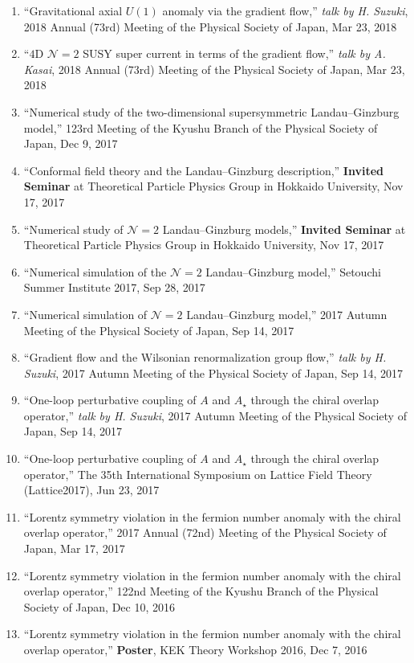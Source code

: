 \begin{enumerate}
 \item ``Gravitational axial $U(1)$ anomaly via the gradient flow,''
       \textit{talk by H. Suzuki},
       2018 Annual (73rd) Meeting of the Physical Society of Japan, Mar 23, 2018
 \item ``$4$D $\mathcal{N}=2$ SUSY super current in terms of the gradient flow,''
       \textit{talk by A. Kasai},
       2018 Annual (73rd) Meeting of the Physical Society of Japan, Mar 23, 2018
 \item ``Numerical study of the two-dimensional supersymmetric Landau--Ginzburg model,''
       123rd Meeting of the Kyushu Branch of the Physical Society of Japan, Dec 9, 2017
 \item ``Conformal field theory and the Landau--Ginzburg description,''
       \textbf{Invited Seminar} at Theoretical Particle Physics Group in Hokkaido University, Nov 17, 2017
 \item ``Numerical study of $\mathcal{N}=2$ Landau--Ginzburg models,''
       \textbf{Invited Seminar} at Theoretical Particle Physics Group in Hokkaido University, Nov 17, 2017
 \item ``Numerical simulation of the $\mathcal{N}=2$ Landau--Ginzburg model,''
       Setouchi Summer Institute 2017, Sep 28, 2017
 \item ``Numerical simulation of $\mathcal{N}=2$ Landau--Ginzburg model,''
       2017 Autumn Meeting of the Physical Society of Japan, Sep 14, 2017
 \item ``Gradient flow and the Wilsonian renormalization group flow,''
       \textit{talk by H. Suzuki},
       2017 Autumn Meeting of the Physical Society of Japan, Sep 14, 2017
 \item ``One-loop perturbative coupling of $A$ and $A_\star$ through the chiral overlap operator,''
       \textit{talk by H. Suzuki},
       2017 Autumn Meeting of the Physical Society of Japan, Sep 14, 2017
 \item ``One-loop perturbative coupling of $A$ and $A_\star$ through the chiral overlap operator,''
       The 35th International Symposium on Lattice Field Theory (Lattice2017), Jun 23, 2017
 \item ``Lorentz symmetry violation in the fermion number anomaly with the chiral overlap operator,''
       2017 Annual (72nd) Meeting of the Physical Society of Japan, Mar 17, 2017
 \item ``Lorentz symmetry violation in the fermion number anomaly with the chiral overlap operator,''
       122nd Meeting of the Kyushu Branch of the Physical Society of Japan, Dec 10, 2016
 \item ``Lorentz symmetry violation in the fermion number anomaly with the chiral overlap operator,''
       \textbf{Poster}, KEK Theory Workshop 2016, Dec 7, 2016
\end{enumerate}

